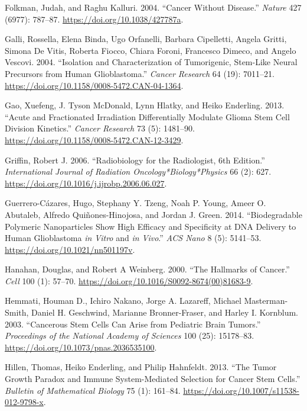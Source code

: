 \documentclass[
  letterpaper,
]{scrreprt}
\newlength{\cslhangindent}
\newenvironment{CSLReferences}[2] %
 {\begin{list}{}{%
  \setlength{\itemindent}{0pt}
  \setlength{\leftmargin}{0pt}
  \setlength{\parsep}{0pt}
  \ifodd #1
   \setlength{\leftmargin}{\cslhangindent}
   \setlength{\itemindent}{-1\cslhangindent}
  \fi
  \setlength{\itemsep}{#2\baselineskip}}}
 {\end{list}}
\theoremstyle{definition}
\theoremstyle{remark}
\begin{document}
\begin{CSLReferences}{1}{0}
Folkman, Judah, and Raghu Kalluri. 2004. {``Cancer Without Disease.''}
\emph{Nature} 427 (6977): 787--87.
\url{https://doi.org/10.1038/427787a}.

Galli, Rossella, Elena Binda, Ugo Orfanelli, Barbara Cipelletti, Angela
Gritti, Simona De Vitis, Roberta Fiocco, Chiara Foroni, Francesco
Dimeco, and Angelo Vescovi. 2004. {``Isolation and Characterization of
Tumorigenic, Stem-Like Neural Precursors from Human Glioblastoma.''}
\emph{Cancer Research} 64 (19): 7011--21.
\url{https://doi.org/10.1158/0008-5472.CAN-04-1364}.

Gao, Xuefeng, J. Tyson McDonald, Lynn Hlatky, and Heiko Enderling. 2013.
{``Acute and Fractionated Irradiation Differentially Modulate Glioma
Stem Cell Division Kinetics.''} \emph{Cancer Research} 73 (5): 1481--90.
\url{https://doi.org/10.1158/0008-5472.CAN-12-3429}.

Griffin, Robert J. 2006. {``Radiobiology for the Radiologist, 6th
Edition.''} \emph{International Journal of Radiation
Oncology*Biology*Physics} 66 (2): 627.
\url{https://doi.org/10.1016/j.ijrobp.2006.06.027}.

Guerrero-Cázares, Hugo, Stephany Y. Tzeng, Noah P. Young, Ameer O.
Abutaleb, Alfredo Quiñones-Hinojosa, and Jordan J. Green. 2014.
{``Biodegradable Polymeric Nanoparticles Show High Efficacy and
Specificity at DNA Delivery to Human Glioblastoma {\emph{in Vitro}} and
{\emph{in Vivo}}.''} \emph{ACS Nano} 8 (5): 5141--53.
\url{https://doi.org/10.1021/nn501197v}.

Hanahan, Douglas, and Robert A Weinberg. 2000. {``The Hallmarks of
Cancer.''} \emph{Cell} 100 (1): 57--70.
\url{https://doi.org/10.1016/S0092-8674(00)81683-9}.

Hemmati, Houman D., Ichiro Nakano, Jorge A. Lazareff, Michael
Masterman-Smith, Daniel H. Geschwind, Marianne Bronner-Fraser, and
Harley I. Kornblum. 2003. {``Cancerous Stem Cells Can Arise from
Pediatric Brain Tumors.''} \emph{Proceedings of the National Academy of
Sciences} 100 (25): 15178--83.
\url{https://doi.org/10.1073/pnas.2036535100}.

Hillen, Thomas, Heiko Enderling, and Philip Hahnfeldt. 2013. {``The
Tumor Growth Paradox and Immune System-Mediated Selection for Cancer
Stem Cells.''} \emph{Bulletin of Mathematical Biology} 75 (1): 161--84.
\url{https://doi.org/10.1007/s11538-012-9798-x}.


\end{CSLReferences}
\end{document}
